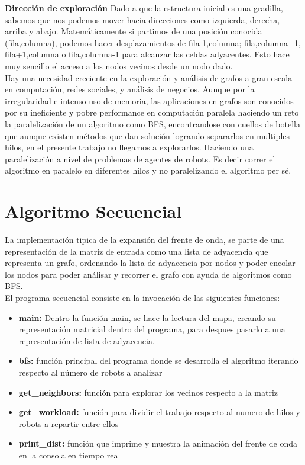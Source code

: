 \documentclass[oneside,twocolumn]{article}
\begin{document}
\textbf{Dirección de exploración} Dado a que la estructura inicial es una gradilla, sabemos que nos podemos mover hacia direcciones como izquierda, derecha, arriba y abajo. Matemáticamente si partimos de una posición conocida (fila,columna), podemos hacer desplazamientos de fila-1,columna; fila,columna+1, fila+1,columna o fila,columna-1 para alcanzar las celdas adyacentes. Esto hace muy sencillo el acceso a los nodos vecinos desde un nodo dado.\\

Hay una necesidad creciente en la exploración y análisis de grafos a gran escala en computación, redes sociales, y análisis de negocios. Aunque por la irregularidad e intenso uso de memoria, las aplicaciones en grafos son conocidos por su ineficiente y pobre performance en computación paralela haciendo un reto la paralelización de un algoritmo como BFS, encontrandose con cuellos de botella que aunque existen métodos que dan solución logrando separarlos en multiples hilos, en el presente trabajo no llegamos a explorarlos. Haciendo una paralelización a nivel de problemas de agentes de robots. Es decir correr el algoritmo en paralelo en diferentes hilos y no paralelizando el algoritmo per sé.



\newpage
\onecolumn
\section{Algoritmo Secuencial}

La implementación tipica de la expansión del frente de onda, se parte de una representación de la matriz de entrada como una lista de adyacencia que representa un grafo, ordenando la lista de adyacencia por nodos y poder encolar los nodos para poder análisar y recorrer el grafo con ayuda de algoritmos como BFS.\\

El programa secuencial consiste en la invocación de las siguientes funciones:

\begin{itemize}
\item \textbf{main:} Dentro la función main, se hace la lectura del mapa, creando su representación matricial dentro del programa, para despues pasarlo a una representación de lista de adyacencia.
\item \textbf{bfs:} función principal del programa donde se desarrolla el algoritmo iterando respecto al número de robots a analizar
\item \textbf{get\_neighbors:} función para explorar los vecinos respecto a la matriz
\item \textbf{get\_workload:} función para dividir el trabajo respecto al numero de hilos y robots a repartir entre ellos
\item \textbf{print\_dist:} función que imprime y muestra la animación del frente de onda en la consola en tiempo real
\end{itemize}
\end{document}
